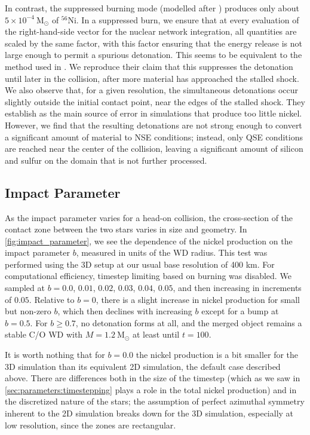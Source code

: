\documentclass[twocolumn,numberedappendix]{../aastex6}
\newcommand{\msolar}{\mathrm{M}_\odot}
\begin{document}


In contrast, the suppressed burning mode (modelled after \citet{kushnir:2013}) produces only about
$5 \times 10^{-4}\ \msolar$ of $^{56}$Ni. In a suppressed burn, we ensure that at every evaluation
of the right-hand-side vector for the nuclear network integration, all quantities are scaled by the
same factor, with this factor ensuring that the energy release is not large enough to permit a
spurious detonation. This seems to be equivalent to the method used in \citet{kushnir:2013}. We
reproduce their claim that this suppresses the detonation until later in the collision, after more
material has approached the stalled shock. We also observe that, for a given resolution, the simultaneous
detonations occur slightly outside the initial contact point, near the edges of the stalled shock. They
establish as the main source of error in simulations that produce too little nickel. However, we find
that the resulting detonations are not strong enough to convert a significant amount of material to NSE
conditions; instead, only QSE conditions are reached near the center of the collision, leaving a significant
amount of silicon and sulfur on the domain that is not further processed.



\subsection{Impact Parameter}
\label{sec:parameters:impactparameter}

As the impact parameter varies for a head-on collision, the cross-section of the contact
zone between the two stars varies in size and geometry. In \autoref{fig:impact_parameter}, we
see the dependence of the nickel production on the impact parameter $b$, measured in units
of the WD radius. This test was performed using the 3D setup at our usual base resolution of
400 km. For computational efficiency, timestep limiting based on burning was disabled.
We sampled at $b = 0.0$, $0.01$, $0.02$, $0.03$, $0.04$, $0.05$, and then increasing
in increments of $0.05$. Relative to $b = 0$, there is a slight increase in nickel production for small
but non-zero $b$, which then declines with increasing $b$ except for a bump at $b = 0.5$.
For $b \ge 0.7$, no detonation forms at all, and the merged object remains a stable C/O WD
with $M = 1.2\ \msolar$ at least until $t = 100$.

It is worth nothing that for $b = 0.0$ the nickel production is a bit smaller for the 3D simulation
than its equivalent 2D simulation, the default case described above. There are differences both in
the size of the timestep (which as we saw in \autoref{sec:parameters:timestepping} plays a role in
the total nickel production) and in the discretized nature of the stars; the assumption of perfect
azimuthal symmetry inherent to the 2D simulation breaks down for the 3D simulation, especially at
low resolution, since the zones are rectangular.
\end{document}

